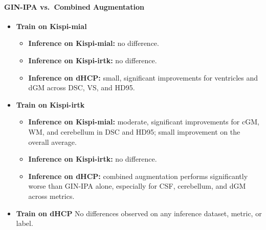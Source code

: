 \paragraph{GIN-IPA vs.\ Combined Augmentation}
\begin{itemize}
  \item \textbf{Train on Kispi-mial}
  \begin{itemize}
    \item \textbf{Inference on Kispi-mial:} no difference.
    \item \textbf{Inference on Kispi-irtk:} no difference.
    \item \textbf{Inference on dHCP:} small, significant improvements for ventricles and dGM across DSC, VS, and HD95.
  \end{itemize}
  \item \textbf{Train on Kispi-irtk}
  \begin{itemize}
    \item \textbf{Inference on Kispi-mial:} moderate, significant improvements for cGM, WM, and cerebellum in DSC and HD95; small improvement on the overall average.
    \item \textbf{Inference on Kispi-irtk:} no difference.
    \item \textbf{Inference on dHCP:} combined augmentation performs significantly worse than GIN-IPA alone, especially for CSF, cerebellum, and dGM across metrics.
  \end{itemize}
  \item \textbf{Train on dHCP}
  No differences observed on any inference dataset, metric, or label.
\end{itemize}
